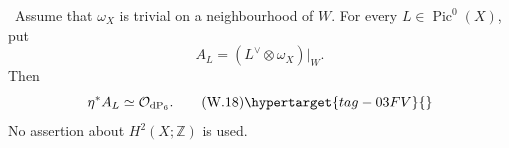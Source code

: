 
\begin{proposition}
\hypertarget{tag-03IO}{}\label{wbII:prop:pic0-pullback}


\ Assume that $\omega_X$ is trivial on a neighbourhood of $W$.
For every $L\in\operatorname{Pic}^0(X)$, put
\[
 A_L=(L^\vee\otimes\omega_X)|_W.
\]
Then
\[
 \eta^*A_L\simeq\mathcal O_{\mathrm{dP}_6}.
\tag{W.18}\hypertarget{tag-03FV}{}\label{wbII:eq:W:5.17a}
\]
No assertion about $H^2(X;\mathbb Z)$ is used.
\end{proposition}

